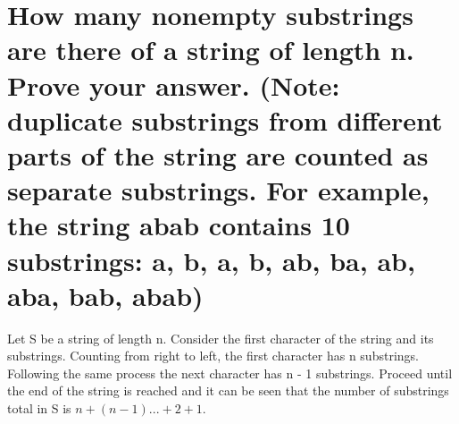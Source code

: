 \documentclass[11pt]{article}
\begin{document}
\section{How many nonempty substrings are there of a string of length n. Prove your answer. (Note: duplicate substrings from different parts of the string are counted as separate substrings. For example, the string abab contains 10 substrings: a, b, a, b, ab, ba, ab, aba, bab, abab)}
\label{sec:org82f029f}
\quad Let S be a string of length n. Consider the first character of the string and its substrings. Counting from right to left, the first character has n substrings. Following the same process the next character has n - 1 substrings. Proceed until the end of the string is reached and it can be seen that the number of substrings total in S is \(n + (n - 1) ... + 2 + 1\). 
\end{document}
